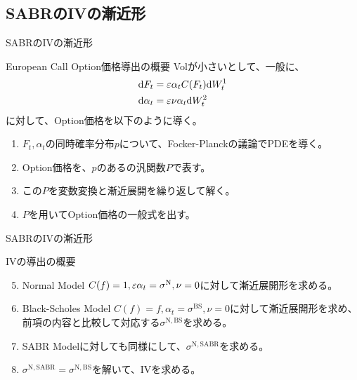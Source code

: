 \documentclass[dvipdfmx,9pt]{beamer}
\begin{document}
\subsection{SABRのIVの漸近形}
\begin{frame}{SABRのIVの漸近形}
  \begin{block}{European Call Option価格導出の概要}
    Volが小さいとして、一般に、
    \begin{align}
      \dd F_{t}      & = \varepsilon \alpha_{t} C(F_{t}) \dd W_{t}^{1} \\
      \dd \alpha_{t} & = \varepsilon \nu \alpha_{t} \dd W_{t}^{2}
    \end{align}
    に対して、Option価格を以下のように導く。
    \begin{enumerate}
      \item $F_{t},\alpha_{t}$の同時確率分布$p$について、Focker-Planckの議論でPDEを導く。
      \item Option価格を、$p$のあるの汎関数$P$で表す。
      \item この$P$を変数変換と漸近展開を繰り返して解く。
      \item $P$を用いてOption価格の一般式を出す。
    \end{enumerate}
  \end{block}
\end{frame}
\begin{frame}{SABRのIVの漸近形}
  \begin{block}{IVの導出の概要}
    \begin{enumerate}
      \setcounter{enumi}{4}
      \item Normal Model $C(f) = 1, \varepsilon\alpha_{t} = \sigma^{\mathrm{N}},\nu = 0$に対して漸近展開形を求める。
      \item Black-Scholes Model $C(f) = f, \alpha_{t} = \sigma^{\mathrm{BS}},\nu = 0$に対して漸近展開形を求め、前項の内容と比較して対応する$\sigma^{\mathrm{N,BS}}$を求める。
      \item SABR Modelに対しても同様にして、$\sigma^{\mathrm{N,SABR}}$を求める。
      \item $\sigma^{\mathrm{N,SABR}} = \sigma^{\mathrm{N,BS}}$を解いて、IVを求める。
    \end{enumerate}
  \end{block}
\end{frame}
\end{document}
